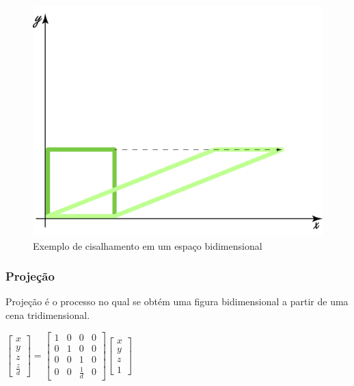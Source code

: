 \documentclass[9pt, a4paper, nofonttune, journal]{IEEEtran}
\begin{document}
\begin{figure}[H] 
\begin{center}
\includegraphics[scale=0.25]{figuras/shear1}
\caption{Exemplo de cisalhamento em um espaço bidimensional}
\end{center}
\end{figure}

\subsubsection{Projeção}
Projeção é o processo no qual se obtém uma figura bidimensional a partir de uma cena tridimensional.\cite{CGPPBook1}


\begin{center}
$\begin{bmatrix}x\\
y\\
z\\
\frac{z}{d}
\end{bmatrix}=\begin{bmatrix}1 & 0 & 0 & 0\\
0 & 1 & 0 & 0\\
0 & 0 & 1 & 0\\
0 & 0 & \frac{1}{d} & 0
\end{bmatrix}\begin{bmatrix}x\\
y\\
z\\
1
\end{bmatrix}$\end{center}
\end{document}
